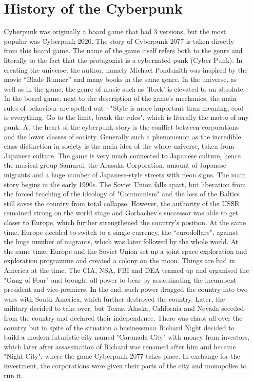 \documentclass[10pt,twoside,english,a4paper]{article}
\begin{document}
\section{History of the Cyberpunk} \label{historia}

	Cyberpunk was originally a board game that had 3 versions, but the most popular was Cyberpunk 2020. The story of Cyberpunk 2077 is taken directly from this board game. The name of the game itself refers both to the genre and literally to the fact that the protagonist is a cybernated punk (Cyber Punk). In creating the universe, the author, namely Michael Pondsmith was inspired by the movie “Blade Runner” and many books in the same genre. In the universe, as well as in the game, the genre of music such as 'Rock' is elevated to an absolute. In the board game, next to the description of the game's mechanics, the main rules of behaviour are spelled out - "Style is more important than meaning, cool is everything. Go to the limit, break the rules", which is literally the motto of any punk.
	At the heart of the cyberpunk story is the conflict between corporations and the lower classes of society. Generally such a phenomenon as the incredible class distinction in society is the main idea of the whole universe, taken from Japanese culture. The game is very much connected to Japanese culture, hence the musical group Samurai, the Arasaka Corporation, amount of Japanese migrants and a huge number of Japanese-style streets with neon signs.
	The main story begins in the early 1990s. The Soviet Union falls apart, but liberation from the forced teaching of the ideology of "Communism" and the loss of the Baltics still saves the country from total collapse. However, the authority of the USSR remained strong on the world stage and Gorbachev's successor was able to get closer to Europe, which further strengthened the country's position. At the same time, Europe decided to switch to a single currency, the “eurodollars”, against the huge number of migrants, which was later followed by the whole world. At the same time, Europe and the Soviet Union set up a joint space exploration and exploration programme and created a colony on the moon.
Things are bad in America at the time. The CIA, NSA, FBI and DEA teamed up and organised the "Gang of Four" and brought all power to bear by assassinating the incumbent president and vice-premiers. In the end, such power dragged the country into two wars with South America, which further destroyed the country. Later, the military decided to take over, but Texas, Alaska, California and Nevada seceded from the country and declared their independence. There was chaos all over the country but in spite of the situation a businessman Richard Night decided to build a modern futuristic city named "Caranada City" with money from investors, which later after assassination of Richard was renamed after him and became "Night City", where the game Cyberpunk 2077 takes place. In exchange for the investment, the corporations were given their parts of the city and monopolies to run it.
\end{document}
